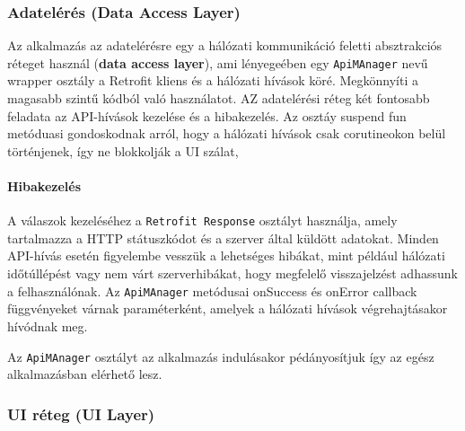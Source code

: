 \subsubsection{Adatelérés (Data Access Layer)}

Az alkalmazás az adatelérésre egy a hálózati kommunikáció feletti absztrakciós réteget használ (\textbf{data access layer}), 
ami lényegeében egy \texttt{ApiMAnager} nevű wrapper osztály a Retrofit kliens és a hálózati hívások köré. Megkönnyíti a magasabb szintű kódból való használatot.
AZ adatelérési réteg két fontosabb feladata az API-hívások kezelése és a hibakezelés.
Az osztáy suspend fun metóduasi gondoskodnak arról,
hogy a hálózati hívások csak corutineokon belül történjenek, így ne blokkolják a UI szálat,
\paragraph{Hibakezelés} A válaszok kezeléséhez a \texttt{Retrofit Response} osztályt használja, 
amely tartalmazza a HTTP státuszkódot és a szerver által küldött adatokat. 
Minden API-hívás esetén figyelembe vesszük a lehetséges hibákat, mint például hálózati időtúllépést vagy nem várt szerverhibákat, 
hogy megfelelő visszajelzést adhassunk a felhasználónak. Az \texttt{ApiMAnager} metódusai onSuccess és onError callback 
függvényeket várnak paraméterként, amelyek a hálózati hívások végrehajtásakor hívódnak meg.

Az \texttt{ApiMAnager} osztályt az alkalmazás indulásakor pédányosítjuk így az egész alkalmazásban elérhető lesz.


\subsubsection{UI réteg (UI Layer)}
